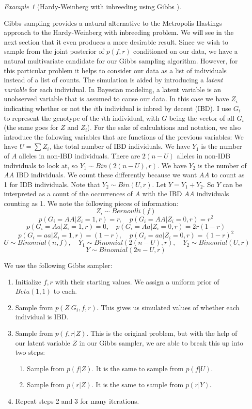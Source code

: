 \documentclass[11pt]{amsart}
\theoremstyle{theorem} %
\theoremstyle{definition}                  %
\theoremstyle{example}                       %
\theoremstyle{remark}                       %
\newtheorem{exmp}[thm]{Example}  %
\numberwithin{equation}{section}
\begin{document}
\begin{exmp}[{Hardy-Weinberg with inbreeding using Gibbs \cite{stephens}}]

\label{ex:inbreedinggibbs}

Gibbs sampling provides a natural alternative to the Metropolis-Hastings approach to the Hardy-Weinberg with inbreeding problem. We will see in the next section that it even produces a more desirable result. Since we wish to sample from the joint posterior of $p(f,r)$ conditioned on our data, we have a natural multivariate candidate for our Gibbs sampling algorithm. However, for this particular problem it helps to consider our data as a list of individuals instead of a list of counts. The simulation is aided by introducing a \emph{latent variable} for each individual. In Bayesian modeling, a latent variable is an unobserved variable that is assumed to cause our data. In this case we have $Z_i$ indicating whether or not the $i$th individual is inbred by decent (IBD). I use $G_i$ to represent the genotype of the $i$th individual, with $G$ being the vector of all $G_i$ (the same goes for $Z$ and $Z_i$). For the sake of calculations and notation, we also introduce the following variables that are functions of the previous variables: We have $U=\sum Z_i$, the total number of IBD individuals. We have $Y_1$ is the number of $A$ alleles in non-IBD individuals. There are $2(n-U)$ alleles in non-IDB individuals to look at, so $Y_1 \sim Bin (2(n-U), r)$. We have $Y_2$ is the number of $AA$ IBD individuals. We count these differently because we want $AA$ to count as 1 for IDB individuals. Note that $Y_2 \sim Bin (U, r)$. Let $Y=Y_1+Y_2$. So $Y$ can be interpreted as a count of the occurrences of $A$ with the IBD $AA$ individuals counting as 1. We note the following pieces of information:
\[Z_i \sim Bernoulli(f)\]
\[p(G_i=AA | Z_i=1,r) = r,\quad p(G_i=AA | Z_i=0,r) = r^2\]
\[p(G_i=Aa | Z_i = 1,r)= 0, \quad p(G_i=Aa | Z_i=0,r) = 2r(1-r)\]
\[p(G_i=aa | Z_i = 1,r) = (1-r), \quad p(G_i =aa | Z_i=0,r) = (1-r)^2\]
\[U\sim Binomial(n,f), \quad  Y_1 \sim Binomial(2(n-U), r), \quad Y_2 \sim Binomial(U, r)\]
\[Y \sim Binomial(2n-U, r)\]


We use the following Gibbs sampler:
\begin{enumerate}
    \item Initialize $f,r$ with their starting values. We assign a uniform prior of $Beta(1,1)$ to each.
    \item Sample from $p(Z|G_i,f,r)$. This gives us simulated values of whether each individual is IBD.
    \item Sample from $p(f,r|Z)$. This is the original problem, but with the help of our latent variable $Z$ in our Gibbs sampler, we are able to break this up into two steps:
        \begin{enumerate}
            \item Sample from $p(f|Z)$. It is the same to sample from $p(f|U)$.
            \item Sample from $p(r|Z)$. It is the same to sample from $p(r|Y)$.
        \end{enumerate}
    \item Repeat steps 2 and 3 for many iterations.
\end{enumerate}


\end{exmp}
\end{document}
